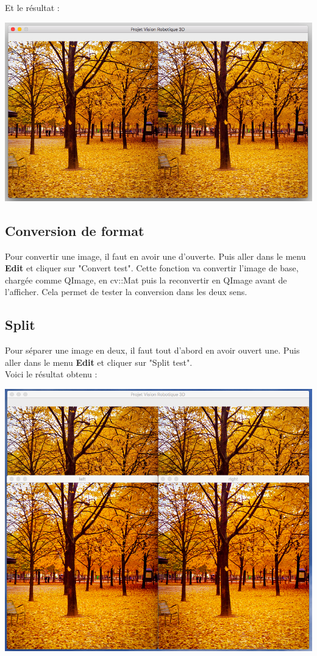 \documentclass[a4paper]{article}
\begin{document}
Et le résultat : \\[0.4cm]
\centerline{\includegraphics[width=\textwidth,height=\textheight,keepaspectratio]{img/2.png}}

\subsection*{Conversion de format}

Pour convertir une image, il faut en avoir une d'ouverte. Puis aller dans le menu
\textbf{Edit} et cliquer sur "Convert test". Cette fonction va convertir l'image de
base, chargée comme QImage, en cv::Mat puis la reconvertir en QImage avant de
l'afficher. Cela permet de tester la conversion dans les deux sens.

\subsection*{Split}

Pour séparer une image en deux, il faut tout d'abord en avoir ouvert une. Puis
aller dans le menu \textbf{Edit} et cliquer sur "Split test". \\
Voici le résultat obtenu : \\[0.4cm]
\centerline{\includegraphics[width=\textwidth,height=\textheight,keepaspectratio]{img/3.png}}
\end{document}
